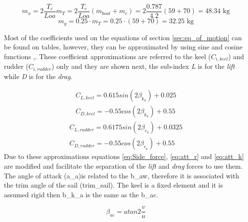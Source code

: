 \begin{equation}\label{eq:mx_add}
    m_{x}=2\frac{T_{c}} {Loa} m_{T}=2\frac{T_{c}} {Loa} (m_{boat} + m_{c})=2\frac{0.787}{4.2}(59+70)=48.34 \text{ kg}
\end{equation}
\begin{equation} \label{eq:my_add}
    m_{y}=0.25 \cdot m_{T}=0.25 \cdot (59+70) = 32.25 \text{ kg}
\end{equation}
\par 
Most of the coefficients used on the equations of section \ref{sec:eq_of_motion} can be found on tables, however, they can be approximated by using sine and cosine functions \cite{rein2012tra},\cite{moreira2011guidance}. These coefficient approximations are referred to the keel ($C_{i,keel}$) and rudder ($C_{i,rudder}$) only and they are shown next, the sub-index \textit{L} is for the \textit{lift} while \textit{D} is for the \textit{drag}. \par 
\begin{subequations} \label{eq:keel_coeff}
    \begin{align}
        C_{L,keel}=0.615sin(2\beta_{k_{a}})+0.025 \label{eq:keel_Liftcoeff}\\ 
        C_{D,keel}=-0.55cos(2\beta_{k_{a}})+0.55 \label{eq:keel_Dragcoeff}
    \end{align}
\end{subequations}
\begin{subequations} \label{eq:rudder_coeff}
    \begin{align}
        C_{L,rudder}=0.6175sin(2\beta_{r_{a}})+0.0325 \label{eq:rudder_Liftcoeff}\\ 
        C_{D,rudder}=-0.55cos(2\beta_{r_{a}})+0.55 \label{eq:rudder_Dragcoeff}
    \end{align}
\end{subequations}
Due to these approximations equations \ref{eq:Side_force}, \ref{eq:att_r} and \ref{eq:att_k} are modified and facilitate the separation of the \textit{lift} and \textit{drag} forces to use them. The angle of attack (\acrshort{a_a})is related to the \acrshort{b_aw}, therefore it is associated with the trim angle of the sail (\acrshort{trim_sail}). The keel is a fixed element and it is assumed rigid then \acrshort{b_k_a} is the same as the \acrshort{b_ac}.   \par \noindent %
\begin{equation} \label{eq:app_current_ang}
    \beta_{ac}=atan2\frac{v}{u}
\end{equation}
